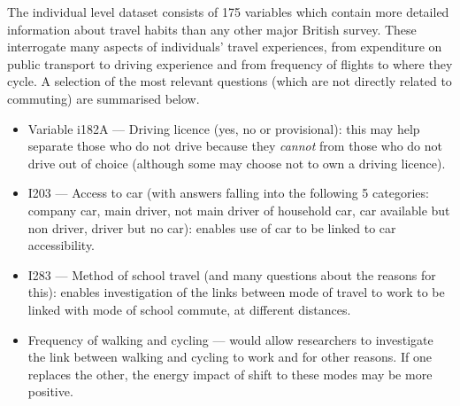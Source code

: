 The individual level dataset consists of 175 variables which contain more
detailed information about travel habits than any other major British survey.
These interrogate many aspects of individuals' travel experiences, from
expenditure on public transport to driving experience and from frequency of
flights to where they cycle. A selection of the most relevant questions (which
are not directly related to
commuting) are summarised below.
\begin{itemize}
 \item  Variable i182A --- Driving licence (yes, no or provisional): this may
 help separate those who
 do not drive because they \emph{cannot} from those who do not drive out of
choice (although some may choose not to own a driving licence).
 \item I203 --- Access to car (with answers falling into the following 5
categories: company car, main driver, not main driver of household car, car
available but non driver, driver but no car): enables use of car to be linked
to car accessibility.
 \item I283 --- Method of school travel (and many questions about the reasons
for this): enables investigation of the links between mode of travel to work to
be linked with mode of school commute, at different distances.
 \item Frequency of walking and cycling --- would allow researchers to
investigate the link between walking and cycling to work and for other reasons.
If one replaces the other, the energy impact of shift to these modes may be
more positive.
\end{itemize}

